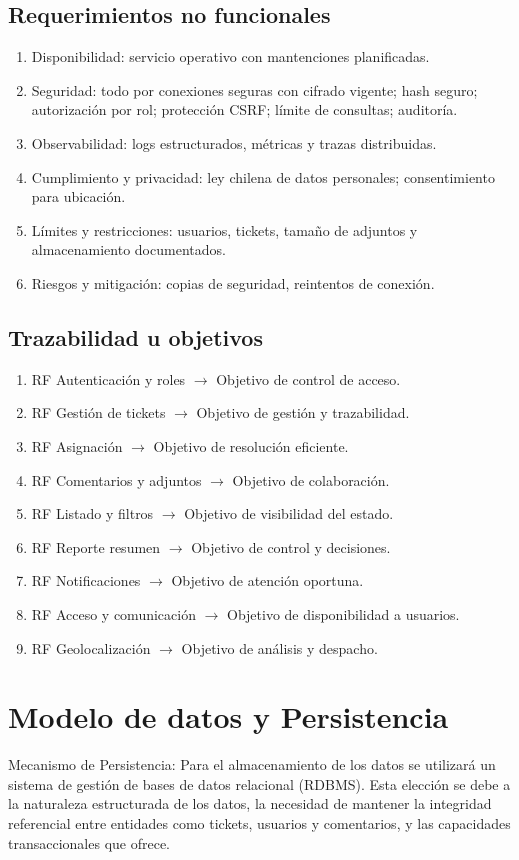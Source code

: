 \documentclass[letter,12pt]{article}
\begin{document}
\subsection{Requerimientos no funcionales}
\begin{enumerate}[leftmargin=*]
    \item Disponibilidad: servicio operativo con mantenciones planificadas.
    \item Seguridad: todo por conexiones seguras con cifrado vigente; hash seguro; autorización por rol; protección CSRF; límite de consultas; auditoría.
    \item Observabilidad: logs estructurados, métricas y trazas distribuidas.
    \item Cumplimiento y privacidad: ley chilena de datos personales; consentimiento para ubicación.
    \item Límites y restricciones: usuarios, tickets, tamaño de adjuntos y almacenamiento documentados.
    \item Riesgos y mitigación: copias de seguridad, reintentos de conexión.
\end{enumerate}
\subsection{Trazabilidad u objetivos}
\begin{enumerate}[leftmargin=*]
    \item RF Autenticación y roles $\rightarrow$ Objetivo de control de acceso.
    \item RF Gestión de tickets $\rightarrow$ Objetivo de gestión y trazabilidad.
    \item RF Asignación $\rightarrow$ Objetivo de resolución eficiente.
    \item RF Comentarios y adjuntos $\rightarrow$ Objetivo de colaboración.
    \item RF Listado y filtros $\rightarrow$ Objetivo de visibilidad del estado.
    \item RF Reporte resumen $\rightarrow$ Objetivo de control y decisiones.
    \item RF Notificaciones $\rightarrow$ Objetivo de atención oportuna.
    \item RF Acceso y comunicación $\rightarrow$ Objetivo de disponibilidad a usuarios.
    \item RF Geolocalización $\rightarrow$ Objetivo de análisis y despacho.
\end{enumerate}
\section{Modelo de datos y Persistencia}
Mecanismo de Persistencia: Para el almacenamiento de los datos se utilizará un sistema de gestión de bases de datos relacional (RDBMS). Esta elección se debe a la naturaleza estructurada de los datos, la necesidad de mantener la integridad referencial entre entidades como tickets, usuarios y comentarios, y las capacidades transaccionales que ofrece.
\end{document}
